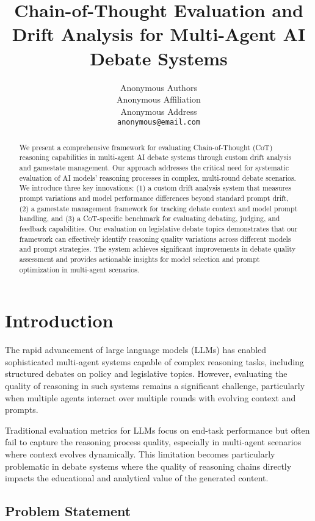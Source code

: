 \documentclass[11pt]{article}
\title{Chain-of-Thought Evaluation and Drift Analysis for Multi-Agent AI Debate Systems}
\author{%
  Anonymous Authors \\
  Anonymous Affiliation \\
  Anonymous Address \\
  \texttt{anonymous@email.com} \\
}
\begin{document}
\maketitle

\begin{abstract}
We present a comprehensive framework for evaluating Chain-of-Thought (CoT) reasoning capabilities in multi-agent AI debate systems through custom drift analysis and gamestate management. Our approach addresses the critical need for systematic evaluation of AI models' reasoning processes in complex, multi-round debate scenarios. We introduce three key innovations: (1) a custom drift analysis system that measures prompt variations and model performance differences beyond standard prompt drift, (2) a gamestate management framework for tracking debate context and model prompt handling, and (3) a CoT-specific benchmark for evaluating debating, judging, and feedback capabilities. Our evaluation on legislative debate topics demonstrates that our framework can effectively identify reasoning quality variations across different models and prompt strategies. The system achieves significant improvements in debate quality assessment and provides actionable insights for model selection and prompt optimization in multi-agent scenarios.
\end{abstract}

\section{Introduction}

The rapid advancement of large language models (LLMs) has enabled sophisticated multi-agent systems capable of complex reasoning tasks, including structured debates on policy and legislative topics. However, evaluating the quality of reasoning in such systems remains a significant challenge, particularly when multiple agents interact over multiple rounds with evolving context and prompts.

Traditional evaluation metrics for LLMs focus on end-task performance but often fail to capture the reasoning process quality, especially in multi-agent scenarios where context evolves dynamically. This limitation becomes particularly problematic in debate systems where the quality of reasoning chains directly impacts the educational and analytical value of the generated content.

\subsection{Problem Statement}
\end{document}

